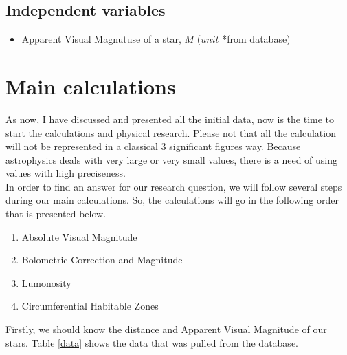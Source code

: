 \documentclass{article}
\begin{document}
  
  \subsection{Independent variables}
  
  \begin{itemize}
    
  \item Apparent Visual Magnutuse of a star, $M$ ($unit$ *from database)
        
  \end{itemize}
  
  
  
  \section{Main calculations}
  
  As now, I have discussed and presented all the initial data, now is the time to start the calculations and physical research. Please not that all the calculation will not be represented in a classical 3 significant figures way. Because astrophysics deals with very large or very small values, there is a need of using values with high preciseness. \\

  In order to find an answer for our research question, we will follow several steps during our main calculations. So, the calculations will go in the following order that is presented below.

  \begin{enumerate}

  \item Absolute Visual Magnitude

  \item Bolometric Correction and Magnitude

  \item Lumonosity

  \item Circumferential Habitable Zones\\
    
    \end{enumerate}
  
  Firstly, we should know the distance and Apparent Visual Magnitude of our stars. Table \ref{data} shows the data that was pulled from the database.
  
\end{document}
